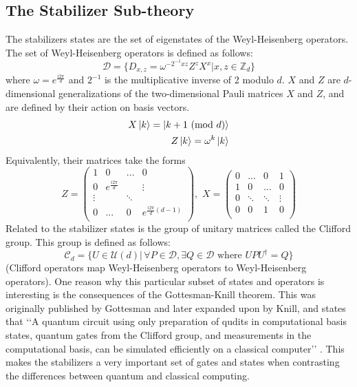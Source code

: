 \documentclass[../3Wworkreport.tex]{subfiles}
\begin{document}
\doreferences

\appendix
{}
\renewcommand{\thesubsection}{\Alph{subsection}}
\renewcommand{\theequation}{\thesubsection.\arabic{equation}}

\subsection{The Stabilizer Sub-theory}
\label{app:stabilizer}

The stabilizers states are the set of eigenstates of the Weyl-Heisenberg operators. The set of Weyl-Heisenberg operators is defined as follows:
\begin{equation}
	\mathcal{D} = \{D_{x,z} = \omega^{-2^{-1}xz}Z^zX^x | x,z \in \mathbb{Z}_d\}
\end{equation}
where $\omega = e^{\frac{i2\pi}{d}}$ and $2^{-1}$ is the multiplicative inverse of 2 modulo $d$. $X$ and $Z$ are $d$-dimensional generalizations of the two-dimensional Pauli matrices $X$ and $Z$, and are defined by their action on basis vectors.
\begin{alignat}{1}
	X\ket{k} = \ket{k + 1 \text{ (mod }d)}\\
	Z\ket{k} = \omega^k\ket{k}
\end{alignat}
Equivalently, their matrices take the forms
\begin{equation}
Z = \left( \begin{array}{cccc}
	1 & 0 & ... & 0\\
	0 & e^{\frac{i2\pi}{d}} &  & \vdots\\
	\vdots & & \ddots & \\
	0 & ... & 0 & e^{\frac{i2\pi}{d}(d-1)}\\
	\end{array} \right), \,\,
X = \left( \begin{array}{cccc}
	0 & ... & 0 & 1\\
	1 & 0 & ... & 0\\
	0 & \ddots & \ddots & \vdots\\
	0 & 0 & 1 & 0\\
	\end{array} \right)
\end{equation}
Related to the stabilizer states is the group of unitary matrices called the Clifford group. This group is defined as follows:
\begin{equation}
	\mathcal{C}_d = \{U \in \mathcal{U}(d) | \,\forall P \in \mathcal{D}, \exists Q \in \mathcal{D} \text{ where } U P U^\dag = Q\}
\end{equation}
(Clifford operators map Weyl-Heisenberg operators to Weyl-Heisenberg operators). One reason why this particular subset of states and operators is interesting is the consequences of the Gottesman-Knill theorem. This was originally published by Gottesman and later expanded upon by Knill, and states that \lq\lq{}A quantum circuit using only preparation of qudits in computational basis states, quantum gates from the Clifford group, and measurements in the computational basis, can be simulated efficiently on a classical computer\rq\rq{} \parencite{Gottesman1998}. This makes the stabilizers a very important set of gates and states when contrasting the differences between quantum and classical computing.
\end{document}
